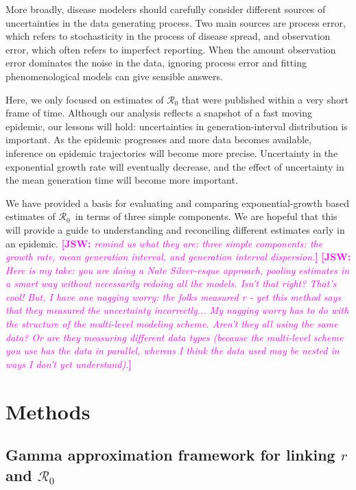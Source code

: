 \documentclass[12pt]{article}
\newcommand{\Rx}[1]{\ensuremath{{\mathcal R}_{#1}}}
\newcommand{\Ro}{\Rx{0}\xspace}
\newcommand{\comment}[3]{\textcolor{#1}{\textbf{[#2: }\textsl{#3}\textbf{]}}}
\newcommand{\jsw}[1]{\comment{magenta}{JSW}{#1}}
\begin{document}
More broadly, disease modelers should carefully consider different sources of uncertainties in the data generating process.
Two main sources are process error, which refers to stochasticity in the process of disease spread, and observation error, which often refers to imperfect reporting.
When the amount observation error dominates the noise in the data, ignoring process error and fitting phenomenological models can give sensible answers.

Here, we only focused on estimates of \Ro that were published within a very short frame of time.
Although our analysis reflects a snapshot of a fast moving epidemic, our lessons will hold: uncertainties in generation-interval distribution is important.
As the epidemic progresses and more data becomes available, inference on epidemic trajectories will become more precise.
Uncertainty in the exponential growth rate will eventually decrease, 
and the effect of uncertainty in the mean generation time will become more important.



We have provided a basis for evaluating and comparing exponential-growth based estimates of \Ro\ in terms of three simple components. We are hopeful that this will provide a guide to understanding and reconciling different estimates early in an epidemic.
\jsw{remind us what they are: 
three simple components: the growth rate, mean generation interval, and generation interval dispersion.}
\jsw{Here is my take: you are doing a Nate Silver-esque approach, pooling estimates in a smart way without necessarily redoing all the models. Isn't that right? That's cool!  
But, I have one nagging worry: the folks measured r - yet this method says that they measured the uncertainty incorrectly... My nagging worry has to do with the structure of the multi-level modeling scheme. Aren't they all using the same data? Or are they measuring different data types (because the multi-level scheme you use has the data in parallel, whereas I think the data used may be nested in ways I don't yet understand).}

\section{Methods}

\subsection{Gamma approximation framework for linking $r$ and $\mathcal R_0$}
\end{document}
